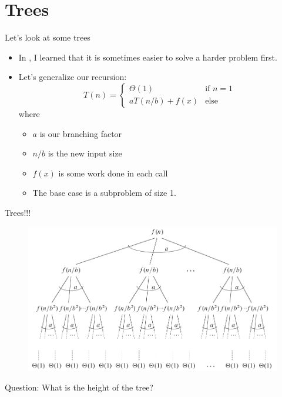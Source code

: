 \documentclass[12pt]{beamer}
\begin{document}
\section{Trees}

\begin{frame}{Let's look at some trees}
\begin{itemize}
\item In , I learned that it is sometimes easier to solve a harder problem first.
\pause
\item Let's generalize our recursion:
\[
	T(n) =
	\begin{cases}
	\Theta(1) & \text{if } n=1\\
	aT(n/b)+f(x) & \text{else}
	\end{cases}
\]
where
\begin{itemize}
\item $a$ is our branching factor
\item $n/b$ is the new input size
\item $f(x)$ is some work done in each call
\item The base case is a subproblem of size 1.
\end{itemize}
\end{itemize}
\end{frame}

\begin{frame}{Trees!!!}
\begin{center}
\begin{figure}
\includegraphics[width=\textwidth]{tree0}
\end{figure}
\end{center}
Question: What is the height of the tree?
\end{frame}
\end{document}
